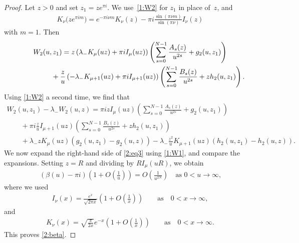 \begin{proof}
Let $z>0$ and set $z_1=ze^{\pi i}$.
We use~\eqref{1:W2} for $z_1$ in place of~$z$, and \cite[(10.34.2)]{NIST}
\begin{gather}\label{3:ancontK}
K_\nu\big(ze^{\pi im}\big)= e^{-\pi i \nu m}K_\nu(z)-\pi i \frac{\sin(\pi \nu m)}{\sin(\pi \nu)} I_\nu(z)
\end{gather}
with $m=1$. Then
\begin{gather*}
 W_2(u,z_1) = z\left(\lambda_-K_\mu(uz)+\pi i I_\mu(uz)\right)\left(\sum_{s=0}^{N-1}\frac{A_s(z)}{u^{2s}}+g_2(u,z_1)\right)\\
\hphantom{W_2(u,z_1) =}{} +\frac{z}{u}\left(-\lambda_-K_{\mu+1}(uz)+\pi i I_{\mu+1}(uz)\right) \left(\sum_{s=0}^{N-1}\frac{B_s(z)}{u^{2s}}+zh_2(u,z_1)\right).
\end{gather*}
Using \eqref{1:W2} a second time, we f\/ind that
\begin{gather*}
 W_2(u,z_1)-\lambda_-W_2(u,z)=\pi i zI_\mu(uz)\left(\sum_{s=0}^{N-1}\frac{A_s(z)}{u^{2s}}+g_2(u,z_1)\right)\\
\qquad{}
+\pi i\frac{z}{u}I_{\mu+1}(uz) \left(\sum_{s=0}^{N-1}\frac{B_s(z)}{u^{2s}}+zh_2(u,z_1)\right)\\
\qquad{}
+\lambda_- zK_\mu(uz) (g_2(u,z_1)-g_2(u,z))-\lambda_-\frac{z^2}{u}K_{\mu+1}(uz)(h_2(u,z_1)-h_2(u,z)).
\end{gather*}
We now expand the right-hand side of \eqref{2:eq3} using \eqref{1:W1}, and compare the expansions.
Setting $z=R$ and dividing by $R I_\mu(uR)$, we obtain
\begin{gather*}
 (\beta(u)-\pi i) \left(1+O\left(\frac1u\right)\right)=O\left(\frac{1}{u^{2N}}\right) \quad \text{as $0<u\to\infty$,}
\end{gather*}
where we used \cite[(10.40.1)]{NIST}
\begin{gather}\label{2:asyI}
 I_\nu(x)=\frac{e^x}{\sqrt{2\pi x}}\left(1+O\left(\frac1x\right)\right)\qquad\text{as} \quad 0<x\to\infty,
\end{gather}
and \cite[(10.40.2)]{NIST}
\begin{gather}\label{2:asyK}
 K_\nu(x)=\sqrt{\frac\pi{2x}}e^{-x}\left(1+O\left(\frac1x\right)\right)\qquad\text{as} \quad 0<x\to\infty.
\end{gather}
This proves \eqref{2:beta}.
\end{proof}
